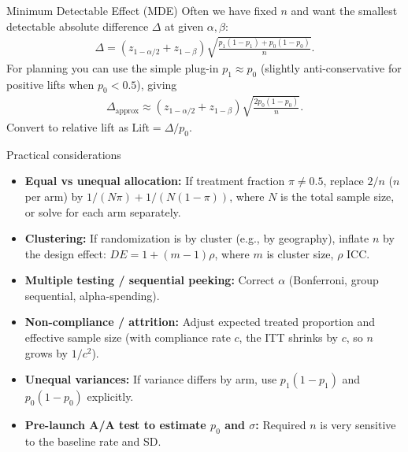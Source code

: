 \documentclass[aspectratio=169,11pt]{beamer}
\begin{document}
\begin{frame}{Minimum Detectable Effect (MDE)}
  Often we have fixed $n$ and want the smallest detectable absolute difference $\Delta$ at given $\alpha, \beta$:
  \begin{align*}
    \Delta = (z_{1-\alpha/2} + z_{1-\beta}) \sqrt{\frac{p_1(1-p_1)+p_0(1-p_0)}{n}}.
  \end{align*}
  For planning you can use the simple plug-in $p_1\approx p_0$ (slightly anti-conservative for positive lifts when $p_0<0.5$), giving
  \begin{align*}
    \Delta_{\text{approx}} \approx (z_{1-\alpha/2} + z_{1-\beta}) \sqrt{\frac{2 p_0(1-p_0)}{n}}.
  \end{align*}
  Convert to relative lift as $\text{Lift} = \Delta / p_0$.
\end{frame}

\begin{frame}{Practical considerations}
  \begin{itemize}
    \item \textbf{Equal vs unequal allocation:} If treatment fraction $\pi \ne 0.5$, replace $2/n$ ($n$ per arm) by $1/(N\pi)+1/(N(1-\pi))$, where $N$ is the total sample size, or solve for each arm separately.
    \item \textbf{Clustering:} If randomization is by cluster (e.g., by geography), inflate $n$ by the design effect: $DE = 1 + (m-1)\rho$, where $m$ is cluster size, $\rho$ ICC.
    \item \textbf{Multiple testing / sequential peeking:} Correct $\alpha$ (Bonferroni, group sequential, alpha-spending).
    \item \textbf{Non-compliance / attrition:} Adjust expected treated proportion and effective sample size (with compliance rate $c$, the ITT shrinks by $c$, so $n$ grows by $1/c^2$).
    \item \textbf{Unequal variances:} If variance differs by arm, use $p_1(1-p_1)$ and $p_0(1-p_0)$ explicitly.
    \item \textbf{Pre-launch A/A test to estimate $p_0$ and $\sigma$:} Required $n$ is very sensitive to the baseline rate and SD.
  \end{itemize}
\end{frame}
\end{document}

